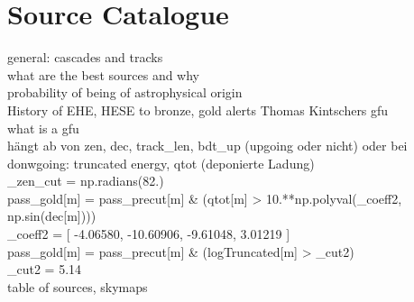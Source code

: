 \chapter{Source Catalogue}
general: cascades and tracks\\
what are the best sources and why\\
probability of being of astrophysical origin\\
History of EHE, HESE to bronze, gold alerts Thomas Kintschers gfu\\
what is a gfu\\
hängt ab von zen, dec, track_len, bdt_up (upgoing oder nicht) oder bei donwgoing: truncated energy, qtot (deponierte Ladung)\\
_zen_cut = np.radians(82.)\\
pass_gold[m]   = pass_precut[m] & (qtot[m] > 10.**np.polyval(_coeff2, np.sin(dec[m])))\\
_coeff2 = [  -4.06580, -10.60906,  -9.61048,   3.01219 ]\\
pass_gold[m]   = pass_precut[m] & (logTruncated[m] > _cut2)\\
_cut2   = 5.14\\

table of sources, skymaps\\
